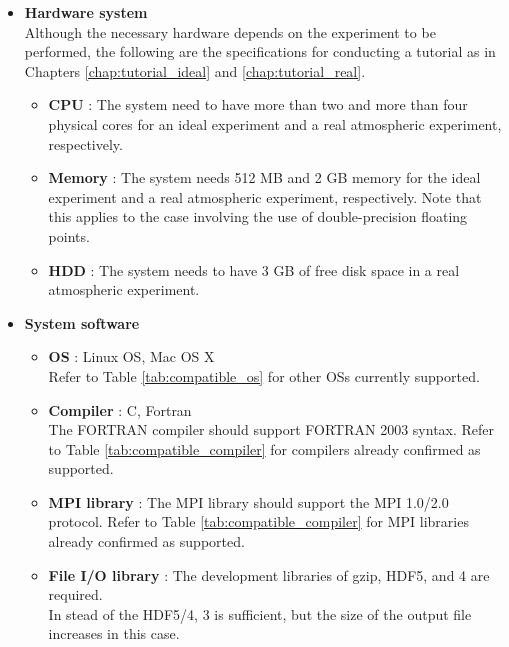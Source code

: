 \begin{itemize}
  \item {\bf Hardware system}\\
  Although the necessary hardware depends on the experiment to be performed,
the following are the specifications for conducting a tutorial as in Chapters \ref{chap:tutorial_ideal} and \ref{chap:tutorial_real}.
  \begin{itemize}
    \item {\bf CPU} :
    The system need to have more than two and more than four physical cores
    for an ideal experiment and a real atmospheric experiment, respectively.
    \item {\bf Memory} :
    The system needs 512 MB and 2 GB memory
    for the ideal experiment and a real atmospheric experiment, respectively.
    Note that this applies to the case involving the use of double-precision floating points.
    \item {\bf HDD} : The system needs to have 3 GB of free disk space in a real atmospheric experiment.
  \end{itemize}
  \item {\bf System software}
  \begin{itemize}
  \item {\bf OS} : Linux OS, Mac OS X\\
  Refer to Table \ref{tab:compatible_os} for other OSs currently supported.
  \item {\bf Compiler} : C, Fortran\\
  The FORTRAN compiler should support FORTRAN 2003 syntax.
  Refer to Table \ref{tab:compatible_compiler} for compilers already confirmed as supported.
  \item {\bf MPI library} :
  The MPI library should support the MPI 1.0/2.0 protocol.  Refer to Table \ref{tab:compatible_compiler} for MPI libraries already confirmed as supported.
  \item {\bf File I/O library} :
  The development libraries of gzip, HDF5, and {\netcdf}4 are required.\\
  In stead of the HDF5/{\netcdf}4, {\netcdf}3 is sufficient, but the size of the output file increases in this case.
  \end{itemize}
\end{itemize}


